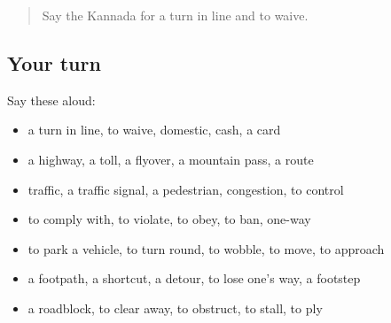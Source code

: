 \label{lesson:KA-R447-review-441-447}



\begin{quote}
Say the Kannada for a turn in line and to waive.
\end{quote}

\subsection*{Your turn}
Say these aloud:

\begin{itemize}
\raggedright
  \item a turn in line, to waive, domestic, cash, a card
  \item a highway, a toll, a flyover, a mountain pass, a route
  \item traffic, a traffic signal, a pedestrian, congestion, to control
  \item to comply with, to violate, to obey, to ban, one-way
  \item to park a vehicle, to turn round, to wobble, to move, to approach
  \item a footpath, a shortcut, a detour, to lose one's way, a footstep
  \item a roadblock, to clear away, to obstruct, to stall, to ply
\end{itemize}

